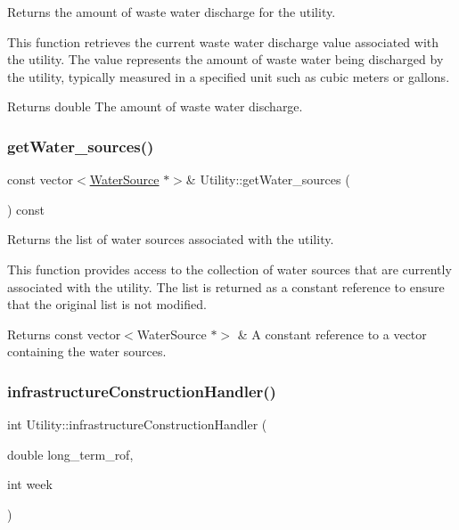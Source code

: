Returns the amount of waste water discharge for the utility. 

This function retrieves the current waste water discharge value associated with the utility. The value represents the amount of waste water being discharged by the utility, typically measured in a specified unit such as cubic meters or gallons.

\begin{DoxyReturn}{Returns}
double The amount of waste water discharge. 
\end{DoxyReturn}
\mbox{\label{classUtility_af68f63148aa901e781b939c8aa3699af}} 
\subsubsection{\texorpdfstring{get\+Water\+\_\+sources()}{getWater\_sources()}}
{\footnotesize\ttfamily const vector$<$\mbox{\hyperlink{classWaterSource}{Water\+Source}} $\ast$$>$\& Utility\+::get\+Water\+\_\+sources (\begin{DoxyParamCaption}{ }\end{DoxyParamCaption}) const}



Returns the list of water sources associated with the utility. 

This function provides access to the collection of water sources that are currently associated with the utility. The list is returned as a constant reference to ensure that the original list is not modified.

\begin{DoxyReturn}{Returns}
const vector$<$\+Water\+Source $\ast$$>$ \& A constant reference to a vector containing the water sources. 
\end{DoxyReturn}
\mbox{\label{classUtility_ae93114986578d3d3fbae56f271ac7df6}} 
\subsubsection{\texorpdfstring{infrastructure\+Construction\+Handler()}{infrastructureConstructionHandler()}}
{\footnotesize\ttfamily int Utility\+::infrastructure\+Construction\+Handler (\begin{DoxyParamCaption}\item[{double}]{long\+\_\+term\+\_\+rof,  }\item[{int}]{week }\end{DoxyParamCaption})}




